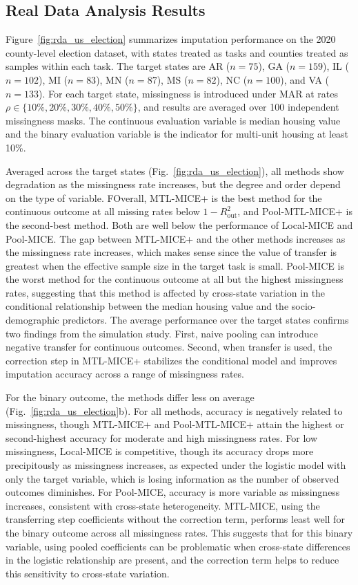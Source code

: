 \documentclass[12pt]{article}
\begin{document}
\subsection{Real Data Analysis Results}
\label{subsec:rda_results}

Figure~\ref{fig:rda_us_election} summarizes imputation performance on the 2020 county-level election dataset, with states treated as tasks and counties treated as samples within each task. The target states are AR ($n=75$), GA ($n=159$), IL ($n=102$), MI ($n=83$), MN ($n=87$), MS ($n=82$), NC ($n=100$), and VA ($n=133$). For each target state, missingness is introduced under MAR at rates $\rho\in\{10\%,20\%,30\%,40\%,50\%\}$, and results are averaged over 100 independent missingness masks. The continuous evaluation variable is median housing value and the binary evaluation variable is the indicator for multi-unit housing at least 10\%.

Averaged across the target states (Fig.~\ref{fig:rda_us_election}), all methods show degradation as the missingness rate increases, but the degree and order depend on the type of variable. FOverall, MTL-MICE+ is the best method for the continuous outcome at all missing rates below $1-R^2_{\mathrm{out}}$, and Pool-MTL-MICE+ is the second-best method. Both are well below the performance of Local-MICE and Pool-MICE. The gap between MTL-MICE+ and the other methods increases as the missingness rate increases, which makes sense since the value of transfer is greatest when the effective sample size in the target task is small. Pool-MICE is the worst method for the continuous outcome at all but the highest missingness rates, suggesting that this method is affected by cross-state variation in the conditional relationship between the median housing value and the socio-demographic predictors. The average performance over the target states confirms two findings from the simulation study. First, naive pooling can introduce negative transfer for continuous outcomes. Second, when transfer is used, the correction step in MTL-MICE+ stabilizes the conditional model and improves imputation accuracy across a range of missingness rates.

For the binary outcome, the methods differ less on average (Fig.~\ref{fig:rda_us_election}b). For all methods, accuracy is negatively related to missingness, though MTL-MICE+ and Pool-MTL-MICE+ attain the highest or second-highest accuracy for moderate and high missingness rates. For low missingness, Local-MICE is competitive, though its accuracy drops more precipitously as missingness increases, as expected under the logistic model with only the target variable, which is losing information as the number of observed outcomes diminishes. For Pool-MICE, accuracy is more variable as missingness increases, consistent with cross-state heterogeneity. MTL-MICE, using the transferring step coefficients without the correction term, performs least well for the binary outcome across all missingness rates. This suggests that for this binary variable, using pooled coefficients can be problematic when cross-state differences in the logistic relationship are present, and the correction term helps to reduce this sensitivity to cross-state variation.
\end{document}
